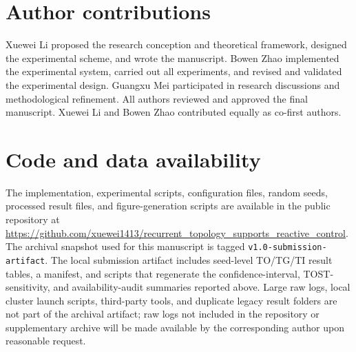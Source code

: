 \documentclass[10pt]{article}
\begin{document}
\section*{Author contributions}
Xuewei Li proposed the research conception and theoretical framework, designed the experimental scheme, and wrote the manuscript. Bowen Zhao implemented the experimental system, carried out all experiments, and revised and validated the experimental design. Guangxu Mei participated in research discussions and methodological refinement. All authors reviewed and approved the final manuscript. Xuewei Li and Bowen Zhao contributed equally as co-first authors.

\section*{Code and data availability}
The implementation, experimental scripts, configuration files, random seeds,
processed result files, and figure-generation scripts are available in the public
repository at
\url{https://github.com/xuewei1413/recurrent_topology_supports_reactive_control}.
The archival snapshot used for this manuscript is tagged
\texttt{v1.0-submission-artifact}. The local submission artifact includes
seed-level TO/TG/TI result tables, a manifest, and scripts that regenerate the
confidence-interval, TOST-sensitivity, and availability-audit summaries reported
above. Large raw logs, local cluster launch scripts, third-party tools, and
duplicate legacy result folders are not part of the archival artifact; raw logs
not included in the repository or supplementary archive will be made available by
the corresponding author upon reasonable request.
\end{document}
